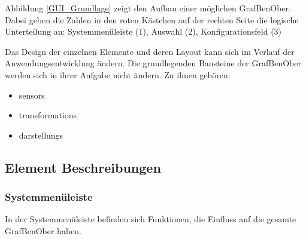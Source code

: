 \documentclass[parskip=full]{scrartcl}
\begin{document}
Abbildung \ref{GUI_Grundlage} zeigt den Aufbau einer möglichen \gls{GrafBenOber}. Dabei geben die Zahlen in den roten Kästchen auf der rechten Seite die logische Unterteilung an: Systemmenüleiste (1), Auswahl (2), Konfigurationsfeld (3)

Das Design der einzelnen Elemente und deren Layout kann sich im Verlauf der Anwendungsentwicklung ändern. Die grundlegenden Bausteine der \gls{GrafBenOber} werden sich in ihrer Aufgabe nicht ändern. Zu ihnen gehören:

\begin{itemize}
	\item \glspl{sensor}
	\item \glspl{transformation}
	\item \glspl{darstellung}
\end{itemize}

\subsection{Element Beschreibungen}

\subsubsection{Systemmenüleiste}

In der Systemmenüleiste befinden sich Funktionen, die Einfluss auf die gesamte \gls{GrafBenOber} haben.
\end{document}

